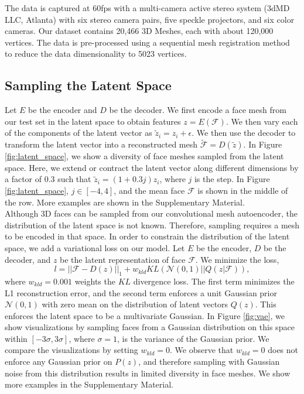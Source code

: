 The data is captured at 60fps with a multi-camera active stereo system
(3dMD LLC, Atlanta) with six stereo camera pairs, five speckle projectors, and
six color cameras.  Our dataset contains 20,466 3D Meshes, each with about 120,000 vertices. The data is pre-processed using a sequential mesh registration method~\cite{FLAME2017} to reduce the data dimensionality to 5023 vertices.

\subsection{Sampling the Latent Space}
\label{sec:latent_sampling}
Let $E$ be the encoder and $D$ be the decoder.
We first encode a face mesh from our test set in the latent space to obtain features $z=E(\mathcal{F})$. We then vary each of the components of the latent vector as $\tilde{z}_i = z_i + \epsilon$. We then use the decoder to transform the latent vector into a reconstructed mesh $\mathcal{\tilde{F}} =D(\tilde{z}) $. In Figure \ref{fig:latent_space}, we show a diversity of face meshes sampled from the latent space. Here, we extend or contract the latent vector along different dimensions by a factor of 0.3 such that $\tilde{z}_i = (1+0.3j) z_i $, where $j$ is the step. In Figure \ref{fig:latent_space}, $j \in [-4, 4]$, and the mean face $\mathcal{F}$ is shown in the middle of the row. More examples are shown in the Supplementary Material. \\

Although 3D faces can be sampled from our convolutional mesh autoencoder, the distribution of the latent space is not known. Therefore, sampling requires a mesh to be encoded in that space. In order to constrain the distribution of the latent space, we add a variational loss on our model. Let $E$ be the encoder, $D$ be the decoder, and $z$ be the latent representation of face $\mathcal{F}$. We minimize the loss,
\begin{equation}
	l = ||\mathcal{F} - D(z) ||_1 + w_{kld} KL(\mathcal{N}(0,1)||Q(z|\mathcal{F})),
\end{equation}
where $w_{kld}=0.001$ weights the $KL$ divergence loss. The first term minimizes the L1 reconstruction error, and the second term enforces a unit Gaussian prior $\mathcal{N}(0,1)$ with zero mean on the distribution of latent vectors $Q(z)$. This enforces the latent space to be a multivariate Gaussian. In Figure \ref{fig:vae}, we show visualizations by sampling faces from a Gaussian distribution on this space within $[-3\sigma, 3\sigma]$, where $\sigma=1$, is the variance of the Gaussian prior. We compare the visualizations by setting $w_{kld}=0$. We observe that $w_{kld}=0$ does not enforce any Gaussian prior on $P(z)$, and therefore sampling with Gaussian noise from this distribution results in limited diversity in face meshes. We show more examples in the Supplementary Material.


